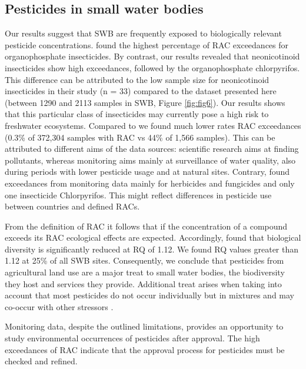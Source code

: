 \documentclass[journal=esthag,manuscript=article]{achemso}
\begin{document}
\subsection{Pesticides in small water bodies}
Our results suggest that SWB are frequently exposed to biologically relevant pesticide concentrations.
\citet{stehle_pesticide_2015} found the highest percentage of RAC exceedances for organophosphate insecticides. 
By contrast, our results revealed that neonicotinoid insecticides show high exceedances, followed by the organophosphate chlorpyrifos. 
This difference can be attributed to the low sample size for neonicotinoid insecticides in their study (n = 33) compared to the dataset presented here (between 1290 and 2113 samples in SWB, Figure \ref{fig:fig6}). 
Our results shows that this particular class of insecticides may currently pose a high risk to freshwater ecosystems.
Compared to \citet{stehle_pesticide_2015} we found much lower rates RAC exceedances (0.3\% of 372,304 samples with RAC vs 44\% of 1,566 samples). 
This can be attributed to different aims of the data sources: scientific research aims at finding pollutants, whereas monitoring aims mainly at surveillance of water quality, also during periods with lower pesticide usage and at natural sites. 
Contrary, \citet{knauer_pesticides_2016} found exceedances from monitoring data mainly for herbicides and fungicides and only one insecticide Chlorpyrifos.
This might reflect differences in pesticide use between countries and defined RACs.

From the definition of RAC it follows that if the concentration of a compound exceeds its RAC ecological effects are expected.
Accordingly, \citet{stehle_agricultural_2015} found that biological diversity is significantly reduced at RQ of 1.12.
We found RQ values greater than 1.12 at 25\% of all SWB sites. 
Consequently, we conclude that pesticides from agricultural land use are a major treat to small water bodies, the biodiversity they host and services they provide. 
Additional treat arises when taking into account that most pesticides do not occur individually but in mixtures \cite{schreiner_pesticide_2016} and may co-occur with other stressors \citep{schafer_contribution_2016}.



Monitoring data, despite the outlined limitations, provides an opportunity to study environmental occurrences of pesticides after approval.
The high exceedances of RAC indicate that the approval process for pesticides must be checked and refined.
\end{document}
